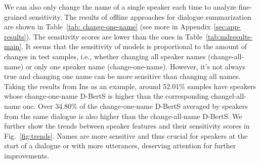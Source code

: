 We can also only change the name of a single speaker each time to analyze fine-grained sensitivity.
The results of offline approaches for dialogue summarization are shown in Table~\ref{tab: change-one-name} (see more in Appendix~\ref{sec:app-results}).
The sensitivity scores are lower than the ones in Table~\ref{tab:mdresults-main}. It seems that the sensitivity of models is proportional to the amount of changes in test samples, i.e., whether changing all speaker names (change-all-name) or only one speaker name (change-one-name). However,
it's not always true and changing one name can be more sensitive than changing all names. Taking the results from Ins as an example, around 52.01\% samples have speakers whose change-one-name D-BertS is higher than the corresponding changel-all-name one. Over 34.80\% of the change-one-name D-BertS averaged by speakers from the same dialogue is also higher than the change-all-name D-BertS. We further show the trends between speaker features and their sensitivity scores in Fig.~\ref{fig:trends}. Names are more sensitive and thus crucial for speakers at the start of a dialogue or with more utterances, deserving attention for further improvements. 


